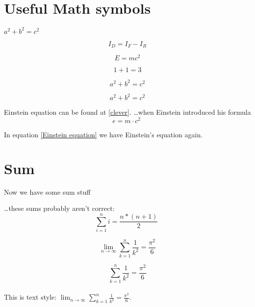 \documentclass{article}
\begin{document}
\section{Useful Math symbols}

$a^2 + b^2 = c^2$

\begin{equation}
I_D = I_F - I_R
\end{equation}

\begin{equation}
   E = mc^2 \label{clever}
 \end{equation}

\begin{equation}
  1 + 1 = 3 
 \end{equation}

\begin{equation}
  a^2 + b^2 = c^2
 \end{equation}

\begin{equation*}
  a^2 + b^2 = c^2
 \end{equation*}

Einstein equation can be found at \eqref{clever}.
\newline
\newline
\ldots when Einstein introduced his formula
\begin{equation}
e = m \cdot c^2 \;
\label{Einstein equation}
\end{equation}

In equation \eqref{Einstein equation} we have Einstein's equation again.

\section{Sum}
Now we have some sum stuff

\ldots these sums probably aren't correct:
\begin{equation}
\sum_{i=1}^{n} i = \frac{n * (n + 1)}{2}\;
\label{sum}
\end{equation}

\begin{equation}
  \lim_{n \to \infty}
  \sum_{k=1}^n \frac{1}{k^2}
  = \frac{\pi^2}{6}
 \end{equation}

\begin{equation}
  \sum_{k=1}^n \frac{1}{k^2}
  = \frac{\pi^2}{6}
 \end{equation}
\\
This is text style:
$\lim_{n \to \infty}
 \sum_{k=1}^n \frac{1}{k^2}
 = \frac{\pi^2}{6}$.
 
\end{document}
